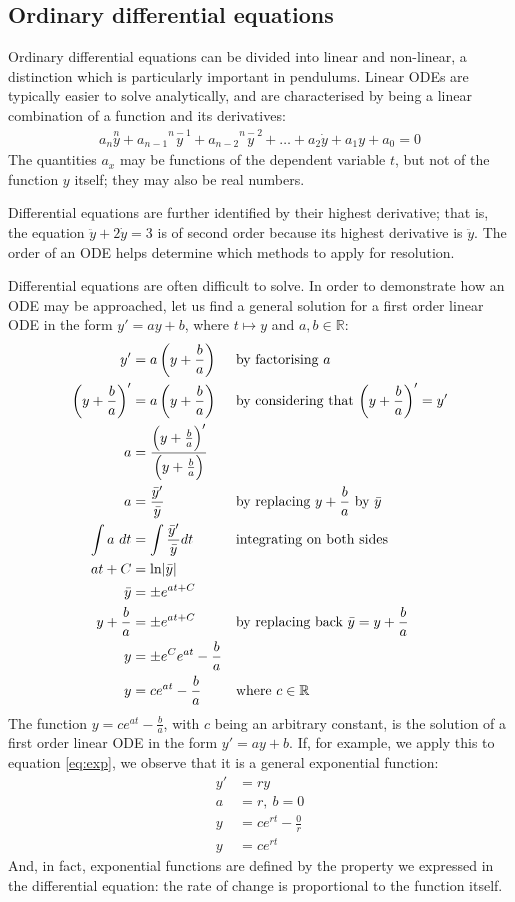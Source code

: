 \documentclass[12pt, a4paper, titlepage]{article}
\theoremstyle{definition}
\numberwithin{equation}{section}
\theoremstyle{definition}
\theoremstyle{definition}
\begin{document}
\subsection{Ordinary differential equations}
Ordinary differential equations can be divided into linear and non-linear, a distinction which is particularly important in pendulums. Linear ODEs are typically easier to solve analytically, and are characterised by being a linear combination of a function and its derivatives: \parencite[p. 5]{ode}
\begin{align}
a_n \overset{n}{y} + a_{n-1} \overset{n-1}{y} + a_{n-2} \overset{n-2}{y} + \hdots + a_2 \dot{y} + a_1 y + a_0 = 0
\end{align}
The quantities $a_x$ may be functions of the dependent variable $t$, but not of the function $y$ itself; they may also be real numbers.

Differential equations are further identified by their highest derivative; that is, the equation $\ddot{y}+2\dot{y}=3$ is of second order because its highest derivative is $\ddot{y}$. The order of an ODE helps determine which methods to apply for resolution. \parencite[p. 4]{firstcourse}

Differential equations are often difficult to solve. In order to demonstrate how an ODE may be approached, let us find a general solution for a first order linear ODE in the form $y'=ay+b$, where $t\mapsto y$ and $a, b\in\mathbb{R}$: \parencite[pp. 7-8]{ode}
\begin{align}
y'&=a\left(y+\frac{b}{a}\right)&&\text{by factorising $a$}\\
\left(y+\frac{b}{a}\right)'&=a\left(y+\frac{b}{a}\right)&&\text{by considering that $\left(y+\frac{b}{a}\right)'=y'$}\\
a&=\frac{\left(y+\frac{b}{a}\right)'}{\left(y+\frac{b}{a}\right)}\\
a&=\frac{\bar{y}'}{\bar{y}}&&\text{by replacing $y+\frac{b}{a}$ by $\bar{y}$}\\
\int a\ dt&=\int\frac{\bar{y}'}{\bar{y}}dt&&\text{integrating on both sides}\\
at+C&=\ln\abs{\bar{y}}\\
\bar{y}&=\pm e^{at+C}\\
y+\frac{b}{a}&=\pm e^{at+C}&&\text{by replacing back $\bar{y}=y+\frac{b}{a}$}\\
y&=\pm e^Ce^{at}-\frac{b}{a}\\
y&=ce^{at}-\frac{b}{a}&&\text{where $c\in\mathbb{R}$}
\end{align}
The function $y=ce^{at}-\frac{b}{a}$, with $c$ being an arbitrary constant, is the solution of a first order linear ODE in the form $y'=ay+b$. If, for example, we apply this to equation \eqref{eq:exp}, we observe that it is a general exponential function:
\begin{align}
y'&=ry\\
a&=r,\ b=0\\
y&=ce^{rt}-\frac{0}{r}\\
y&=ce^{rt}
\end{align}
And, in fact, exponential functions are defined by the property we expressed in the differential equation: the rate of change is proportional to the function itself.
\end{document}
